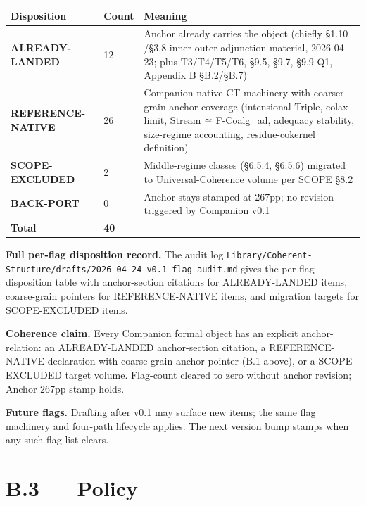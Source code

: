 \documentclass[11pt, openany]{book}
\newcommand{\sectionbreak}{\clearpage}
\begin{document}
\begingroup\setlength{\tabcolsep}{3pt}\renewcommand{\arraystretch}{1.15}\footnotesize
\begin{center}
\begin{tabular}{p{0.52in} p{0.52in} p{3.30in}}
\toprule
Disposition & Count & Meaning \\
\midrule
\textbf{ALREADY-LANDED} & 12 & Anchor already carries the object (chiefly §1.10 /\allowbreak  §3.8 inner-outer adjunction material, 2026-04-23; plus T3/\allowbreak T4/\allowbreak T5/\allowbreak T6, §9.5, §9.7, §9.9 Q1, Appendix B §B.2/\allowbreak §B.7) \\
\textbf{REFERENCE-NATIVE} & 26 & Companion-native CT machinery with coarser-grain anchor coverage (intensional Triple, colax-limit, Stream ≃ F-Coalg\_\allowbreak{}ad, adequacy stability, size-regime accounting, residue-cokernel definition) \\
\textbf{SCOPE-EXCLUDED} & 2 & Middle-regime classes (§6.5.4, §6.5.6) migrated to Universal-Coherence volume per SCOPE §8.2 \\
\textbf{BACK-PORT} & 0 & Anchor stays stamped at 267pp; no revision triggered by Companion v0.1 \\
\textbf{Total} & \textbf{40} &  \\
\bottomrule
\end{tabular}
\end{center}
\endgroup
\textbf{Full per-flag disposition record.} The audit log \texttt{Library/Coherent-Structure/drafts/2026-04-24-v0.1-flag-audit.md} gives the per-flag disposition table with anchor-section citations for ALREADY-LANDED items, coarse-grain pointers for REFERENCE-NATIVE items, and migration targets for SCOPE-EXCLUDED items.

\textbf{Coherence claim.} Every Companion formal object has an explicit anchor-relation: an ALREADY-LANDED anchor-section citation, a REFERENCE-NATIVE declaration with coarse-grain anchor pointer (B.1 above), or a SCOPE-EXCLUDED target volume. Flag-count cleared to zero without anchor revision; Anchor 267pp stamp holds.

\textbf{Future flags.} Drafting after v0.1 may surface new items; the same flag machinery and four-path lifecycle applies. The next version bump stamps when any such flag-list clears.

\sectionbreak

\section{B.3 --- Policy}
\end{document}
